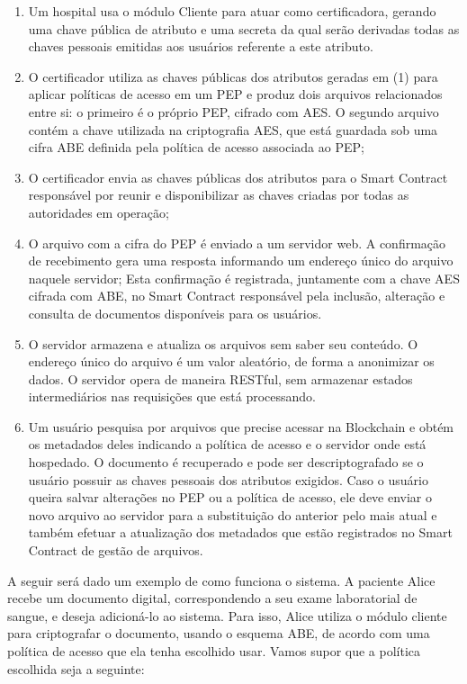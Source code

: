 \documentclass[a4paper,11pt]{article}
\begin{document}
\begin{enumerate}[label=(\arabic*)]
  \item Um hospital usa o módulo Cliente para atuar como certificadora, gerando uma chave pública de atributo e uma secreta da qual serão derivadas todas as chaves pessoais emitidas aos usuários referente a este atributo.
  \item O certificador utiliza as chaves públicas dos atributos geradas em (1) para aplicar políticas de acesso em um PEP e produz dois arquivos relacionados entre si:
  o primeiro é o próprio PEP, cifrado com AES.
  O segundo arquivo contém a chave utilizada na criptografia AES, que está guardada sob uma cifra ABE definida pela política de acesso associada ao PEP;%
  \item O certificador envia as chaves públicas dos atributos para o Smart Contract responsável por reunir e disponibilizar as chaves criadas por todas as autoridades em operação;
  \item O arquivo com a cifra do PEP é enviado a um servidor web.
  A confirmação de recebimento gera uma resposta informando um endereço único do arquivo naquele servidor;
  Esta confirmação é registrada, juntamente com a chave AES cifrada com ABE, no Smart Contract responsável pela inclusão, alteração e consulta de documentos disponíveis para os usuários. %
  \item O servidor armazena e atualiza os arquivos sem saber seu conteúdo.
  O endereço único do arquivo é um valor aleatório, de forma a anonimizar os dados.
  O servidor opera de maneira RESTful, sem armazenar estados intermediários nas requisições que está processando.
  \item Um usuário pesquisa por arquivos que precise acessar na Blockchain e obtém os metadados deles indicando a política de acesso e o servidor onde está hospedado.
  O documento é recuperado e pode ser descriptografado se o usuário possuir as chaves pessoais dos atributos exigidos.
  Caso o usuário queira salvar alterações no PEP ou a política de acesso, ele deve enviar o novo arquivo ao servidor para a substituição do anterior pelo mais atual e também efetuar a atualização dos metadados que estão registrados no Smart Contract de gestão de arquivos.
\end{enumerate}

A seguir será dado um exemplo de como funciona o sistema.
A paciente Alice recebe um documento digital, correspondendo a seu exame laboratorial de sangue, e deseja adicioná-lo ao sistema.
Para isso, Alice utiliza o módulo cliente para criptografar o documento, usando o esquema ABE, de acordo com uma política de acesso que ela tenha escolhido usar.
Vamos supor que a política escolhida seja a seguinte:
\end{document}
